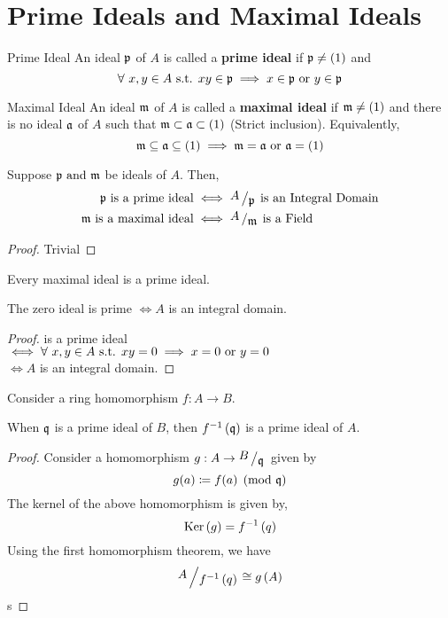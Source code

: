 \section{Prime Ideals and Maximal Ideals}

\begin{defn}{Prime Ideal}{}
	An ideal \( \mathfrak{p} \) of \( A \) is called a \textbf{prime ideal} if
	\( \mathfrak{p} \neq \left( 1 \right) \) and
	\[
		\forall\ x, y \in A \text{ s.t. } xy \in \mathfrak{p} \implies x \in \mathfrak{p} \text{ or } y \in \mathfrak{p}
	\]
\end{defn}

\begin{defn}{Maximal Ideal}{}
	An ideal \( \mathfrak{m} \) of \( A \) is called a \textbf{maximal ideal} if
	\( \mathfrak{m} \neq \left( 1 \right) \) and
	there is no ideal \( \mathfrak{a} \) of \( A \) such that
	\( \mathfrak{m} \subset \mathfrak{a} \subset \left( 1 \right) \) (Strict inclusion).
	Equivalently,
	\[
		\mathfrak{m} \subseteq \mathfrak{a} \subseteq \left( 1 \right) \implies
		\mathfrak{m} = \mathfrak{a} \text{ or } \mathfrak{a} = \left( 1 \right)
	\]
\end{defn}

\begin{theorem}{}{}
	Suppose \( \mathfrak{p} \text{ and } \mathfrak{m} \) be ideals of \( A \).
	Then,
	\begin{align*}
		\mfp \text{ is a prime ideal} &\iff
			\bigslant{A}{\mfp} \text{ is an Integral Domain} \\
		\mfm \text{ is a maximal ideal} &\iff
			\bigslant{A}{\mfm} \text{ is a Field}
	\end{align*}
\end{theorem}
\begin{proof}
	Trivial
\end{proof}

\begin{corollary}{}{}
	Every maximal ideal is a prime ideal.
\end{corollary}

\begin{lemma}{}{}
	The zero ideal is prime \( \iff A \) is an integral domain.
\end{lemma}
\begin{proof}
	 is a prime ideal \\
	\( \iff \forall\ x, y \in A \text{ s.t. } xy = 0 \implies x = 0 \text{ or } y = 0 \) \\
	\( \iff A \) is an integral domain.
\end{proof}

Consider a ring homomorphism \( f: A \to B \).
\begin{claim}{}{}
	When \( \mathfrak{q} \) is a prime ideal of \( B \), then
	\( f^{-1} \left( \mathfrak{q} \right) \) is a prime ideal of \( A \).
\end{claim}
\begin{proof}
	Consider a homomorphism \( g: A \to \bigslant{B}{\mfq} \) given by
	\[ g(a) \coloneqq f(a) \pmod {\mathfrak{q}} \]
	The kernel of the above homomorphism is given by,
	\[ \operatorname{Ker}\left( g \right) = f^{-1}\left( q \right) \]
	Using the first homomorphism theorem, we have
	\[ \bigslant{A}{f\inv\brak{q}} \cong g\brak{A} \]
	s
\end{proof}

